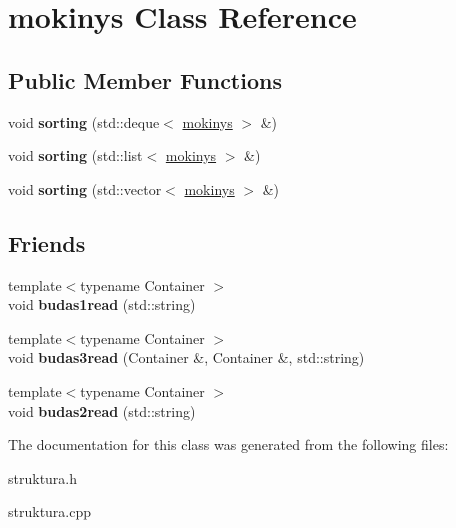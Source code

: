 \hypertarget{classmokinys}{}\section{mokinys Class Reference}
\label{classmokinys}
\subsection*{Public Member Functions}
\begin{DoxyCompactItemize}
\item 
\mbox{\label{classmokinys_ad62d51d5cc994e7f5eafa2e390688077}} 
void {\bfseries sorting} (std\+::deque$<$ \mbox{\hyperlink{classmokinys}{mokinys}} $>$ \&)
\item 
\mbox{\label{classmokinys_a6d32c4a9543d6c5f4b9397f420e4f9d7}} 
void {\bfseries sorting} (std\+::list$<$ \mbox{\hyperlink{classmokinys}{mokinys}} $>$ \&)
\item 
\mbox{\label{classmokinys_ab61c7094a01f5e7123746d7be3e7ef78}} 
void {\bfseries sorting} (std\+::vector$<$ \mbox{\hyperlink{classmokinys}{mokinys}} $>$ \&)
\end{DoxyCompactItemize}
\subsection*{Friends}
\begin{DoxyCompactItemize}
\item 
\mbox{\label{classmokinys_a02d1b3fd5ca439661d3d62422b4c89bc}} 
{\footnotesize template$<$typename Container $>$ }\\void {\bfseries budas1read} (std\+::string)
\item 
\mbox{\label{classmokinys_a2cffa549b1392da424504be470293a57}} 
{\footnotesize template$<$typename Container $>$ }\\void {\bfseries budas3read} (Container \&, Container \&, std\+::string)
\item 
\mbox{\label{classmokinys_af50fec4d6b7ff87a3b751bb7f27d2a6c}} 
{\footnotesize template$<$typename Container $>$ }\\void {\bfseries budas2read} (std\+::string)
\end{DoxyCompactItemize}


The documentation for this class was generated from the following files\+:\begin{DoxyCompactItemize}
\item 
struktura.\+h\item 
struktura.\+cpp\end{DoxyCompactItemize}
